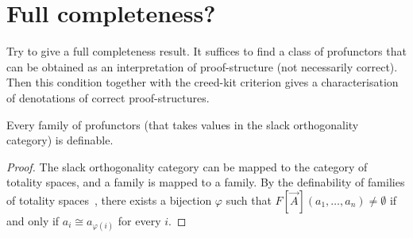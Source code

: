 \section{Full completeness?}
Try to give a full completeness result.
It suffices to find a class of profunctors that can be obtained as an interpretation of proof-structure (not necessarily correct).
Then this condition together with the creed-kit criterion gives a characterisation of denotations of correct proof-structures.

\begin{theorem}
    Every family of profunctors (that takes values in the slack orthogonality category) is definable.
\end{theorem}
\begin{proof}
    The slack orthogonality category can be mapped to the category of totality spaces, and a family is mapped to a family.
    By the definability of families of totality spaces~\cite{Loader1994}, there exists a bijection \( \varphi \) such that \( F[\vec{A}](a_1,\dots,a_n) \neq \emptyset \) if and only if \( a_i \cong a_{\varphi(i)} \) for every \( i \).
\end{proof}


